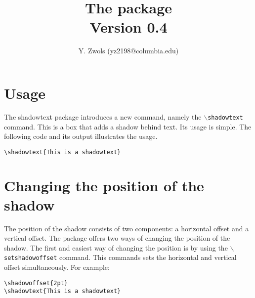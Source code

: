 \documentclass{article}
\begin{document}
\title{\bf The 
\shadowoffset{1.5pt}
package \\ \bigskip \normalfont\small Version 0.4}
\author{Y. Zwols (yz2198@columbia.edu)}
\maketitle

\shadowoffset{1pt}
\parindent=0pt
\parskip=8pt

\section{Usage}
The shadowtext package introduces a new command, namely the {\tt $\backslash$shadowtext} command. This is a box
that adds a shadow behind text. Its usage is simple. The following code and its output illustrates the usage. 

\begin{minipage}{\textwidth}
\begin{multicols*}{2} 
{\footnotesize
\begin{verbatim}
\shadowtext{This is a shadowtext}
\end{verbatim}}

\end{multicols*}
\end{minipage}

\section{Changing the position of the shadow}
The position of the shadow consists of two components: a horizontal offset and a vertical offset. 
The package offers two ways of changing the position of the shadow. The first and easiest way of 
changing the position is by using the {\tt $\backslash$setshadowoffset} command. This commands
sets the horizontal and vertical offset simultaneously. For example:

\begin{minipage}{\textwidth}
\begin{multicols*}{2} 
{\footnotesize
\begin{verbatim}
\shadowoffset{2pt}
\shadowtext{This is a shadowtext}
\end{verbatim}}

\shadowoffset{2pt}
\end{multicols*}
\end{minipage}
\end{document}

